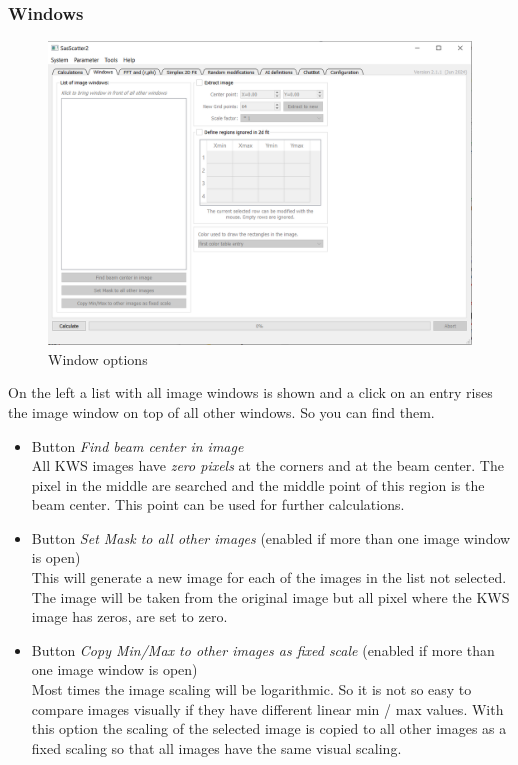 \documentclass[11pt]{article} %
\begin{document}
\subsubsection{Windows}
\begin{figure}[H]
 \centering
 \includegraphics[width=\textwidth]{gui-windows.png}
 \caption{Window options}
\end{figure}

On the left a list with all image windows is shown and a click on an entry rises the image window on top of all other windows. So you can find them.
\begin{itemize}\itemsep0pt
\item Button {\it Find beam center in image} \\
	All KWS images have {\it zero pixels} at the corners and at the beam center. The pixel in the middle are searched and the middle point of this region is the beam center. This point can be used for further calculations.
\item Button {\it Set Mask to all other images} (enabled if more than one image window is open) \\
	This will generate a new image for each of the images in the list not selected. The image will be taken from the original image but all pixel where the KWS image has zeros, are set to zero.
\item Button {\it Copy Min/Max to other images as fixed scale} (enabled if more than one image window is open) \\
	Most times the image scaling will be logarithmic. So it is not so easy to compare images visually if they have different linear min / max values. With this option the scaling of the selected image is copied to all other images as a fixed scaling so that all images have the same visual scaling.
\end{itemize}
\end{document}
